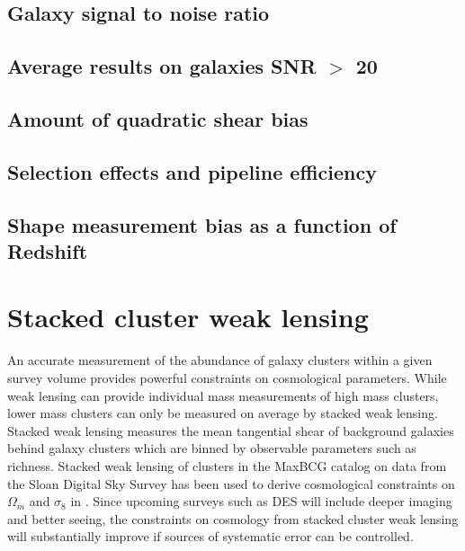 \documentclass[useAMS,usenatbib]{mn2e}
\begin{document}
\subsection{Galaxy signal to noise ratio}\label{sec:SNR}


\subsection{Average results on galaxies SNR $>$ 20}


\subsection{Amount of quadratic shear bias}


\subsection{Selection effects and pipeline efficiency }


\subsection{Shape measurement bias as a function of Redshift}



\section{Stacked cluster weak lensing}
An accurate measurement of the abundance of galaxy clusters within a
given survey volume provides powerful constraints on cosmological
parameters.  While weak lensing can provide individual mass
measurements of high mass clusters, lower mass clusters can only be
measured on average by stacked weak lensing. Stacked weak lensing
measures the mean tangential shear of  background galaxies behind
galaxy clusters which are binned by observable parameters such as
richness. Stacked weak lensing
of clusters in the MaxBCG catalog \citep{Koester, Eshel} on data from the 
Sloan Digital Sky Survey \citep{York} has been used to derive
cosmological constraints on $\Omega_m$ and $\sigma_8$ in
\citep{Ying, ERozo}. Since upcoming surveys such as DES  will include deeper
imaging and better seeing, the constraints on cosmology
from stacked cluster weak lensing will substantially improve if
sources of systematic error can be controlled. \\
\end{document}
